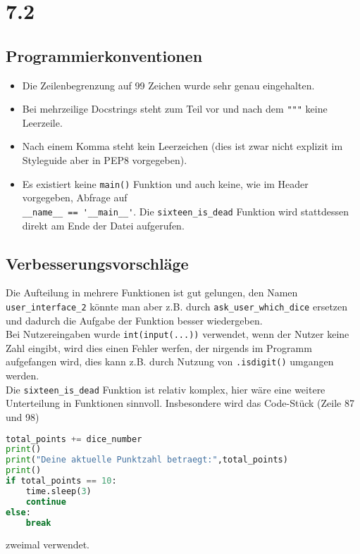 \section*{7.2}\label{section:7.2}

\subsection*{Programmierkonventionen}
\begin{itemize}
\item Die Zeilenbegrenzung auf 99 Zeichen wurde sehr genau eingehalten.
\item Bei mehrzeilige Docstrings steht zum Teil vor und nach dem \verb+"""+ keine Leerzeile.
\item Nach einem Komma steht kein Leerzeichen (dies ist zwar nicht explizit im Styleguide aber in PEP8 vorgegeben).
\item Es existiert keine \verb+main()+ Funktion und auch keine, wie im Header vorgegeben, Abfrage auf\\
\verb+__name__ == '__main__'+. Die \verb+sixteen_is_dead+ Funktion wird stattdessen direkt am Ende der Datei aufgerufen.
\end{itemize}

\subsection*{Verbesserungsvorschläge}

Die Aufteilung in mehrere Funktionen ist gut gelungen, den Namen \verb+user_interface_2+ könnte man aber z.B. durch \verb+ask_user_which_dice+ ersetzen und dadurch die Aufgabe der Funktion besser wiedergeben.\\

Bei Nutzereingaben wurde \verb+int(input(...))+ verwendet, wenn der Nutzer keine Zahl eingibt, wird dies einen Fehler werfen, der nirgends im Programm aufgefangen wird, dies kann z.B. durch Nutzung von \verb+.isdigit()+ umgangen werden.\\

Die \verb+sixteen_is_dead+ Funktion ist relativ komplex, hier wäre eine weitere Unterteilung in Funktionen sinnvoll. Insbesondere wird das Code-Stück (Zeile 87 und 98)
\begin{lstlisting}[language=Python]
total_points += dice_number
print()
print("Deine aktuelle Punktzahl betraegt:",total_points)
print()
if total_points == 10:
    time.sleep(3)
    continue
else:
    break
\end{lstlisting}
zweimal verwendet.\\

